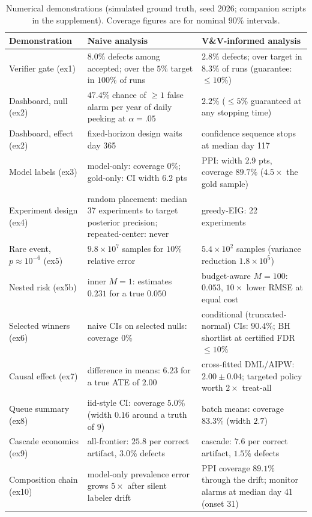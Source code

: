 \documentclass[11pt,a4paper]{article}
\begin{document}
\begin{table}[t]
\centering\small
\caption{Numerical demonstrations (simulated ground truth, seed 2026;
companion scripts in the supplement). Coverage figures are for nominal
$90\%$ intervals.}
\label{tab:numbers}
\begin{tabular}{@{}L{3.4cm}L{5.1cm}L{5.1cm}@{}}
\toprule
Demonstration & Naive analysis & V\&V-informed analysis \\
\midrule
Verifier gate (ex1) & $8.0\%$ defects among accepted; over the $5\%$
target in $100\%$ of runs & $2.8\%$ defects; over target in $8.3\%$ of runs
(guarantee: $\le 10\%$) \\
Dashboard, null (ex2) & $47.4\%$ chance of $\ge 1$ false alarm per year of
daily peeking at $\alpha=.05$ & $2.2\%$ ($\le 5\%$ guaranteed at any
stopping time) \\
Dashboard, effect (ex2) & fixed-horizon design waits day 365 & confidence
sequence stops at median day 117 \\
Model labels (ex3) & model-only: coverage $0\%$; gold-only: CI width 6.2 pts
& PPI: width 2.9 pts, coverage $89.7\%$ ($4.5\times$ the gold sample) \\
Experiment design (ex4) & random placement: median 37 experiments to target
posterior precision; repeated-center: never & greedy-EIG: 22 experiments \\
Rare event, $p\!\approx\!10^{-6}$ (ex5) & $9.8\times 10^{7}$ samples for
$10\%$ relative error & $5.4\times 10^{2}$ samples (variance reduction
$1.8\times 10^{5}$) \\
Nested risk (ex5b) & inner $M{=}1$: estimates $0.231$ for a true $0.050$ &
budget-aware $M{=}100$: $0.053$, $10\times$ lower RMSE at equal cost \\
Selected winners (ex6) & naive CIs on selected nulls: coverage $0\%$ &
conditional (truncated-normal) CIs: $90.4\%$; BH shortlist at certified
FDR $\le 10\%$ \\
Causal effect (ex7) & difference in means: $6.23$ for a true ATE of $2.00$
& cross-fitted DML/AIPW: $2.00 \pm 0.04$; targeted policy worth $2\times$
treat-all \\
Queue summary (ex8) & iid-style CI: coverage $5.0\%$ (width $0.16$ around a
truth of $9$) & batch means: coverage $83.3\%$ (width $2.7$) \\
Cascade economics (ex9) & all-frontier: $25.8$ per correct artifact,
$3.0\%$ defects & cascade: $7.6$ per correct artifact, $1.5\%$ defects \\
Composition chain (ex10) & model-only prevalence error grows $5\times$
after silent labeler drift & PPI coverage $89.1\%$ through the drift;
monitor alarms at median day 41 (onset 31) \\
\bottomrule
\end{tabular}
\end{table}
\end{document}
